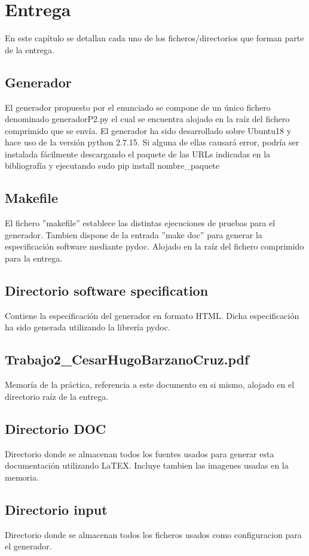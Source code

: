 \documentclass[a4paper,11pt]{book}
\begin{document}
\chapter{Entrega}
En este capítulo se detallan cada uno de los ficheros/directorios que forman parte de la entrega. 

\section{Generador}
El generador propuesto por el enunciado se compone de un único fichero denominado generadorP2.py el cual se encuentra alojado en la raíz del fichero comprimido que se envía. El generador ha sido desarrollado sobre Ubuntu18 y hace uso de la versión python 2.7.15. Si alguna de ellas causará error, podría ser instalada fácilmente descargando el paquete de las URLs indicadas en la bibliografía y ejecutando sudo pip install nombre\_paquete 

\section{Makefile}
El fichero ''makefile'' establece las distintas ejecuciones de pruebas para el generador. Tambien dispone de la entrada ''make doc'' para generar la especificación software mediante pydoc. Alojado en la raíz del fichero comprimido para la entrega. 

\section{Directorio software specification}
Contiene la especificación del generador en formato HTML. Dicha especificación ha sido generada utilizando la librería pydoc. 

\section{Trabajo2\_CesarHugoBarzanoCruz.pdf}
Memoría de la práctica, referencia a este documento en si mismo, alojado en el directorio raíz de la entrega. 

\section{Directorio DOC}
Directorio donde se almacenan todos los fuentes usados para generar esta documentación utilizando LaTEX. Incluye tambien las imagenes usadas en la memoria. 

\section{Directorio input}
Directorio donde se almacenan todos los ficheros usados como configuracion para el generador.
\end{document}
